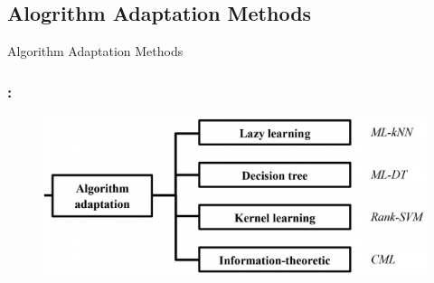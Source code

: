 \documentclass{beamer}
\begin{document}
\subsection{Alogrithm Adaptation Methods}
\begin{frame}
\Huge{\centerline{Algorithm Adaptation Methods}}
\end{frame}
\begin{frame}
\frametitle{\insertsection : \insertsubsection}
\begin{figure}
\begin{center}
\includegraphics[scale = 0.75]{images/aa.png}
\end{center}
\end{figure}
\end{frame}
\end{document}
